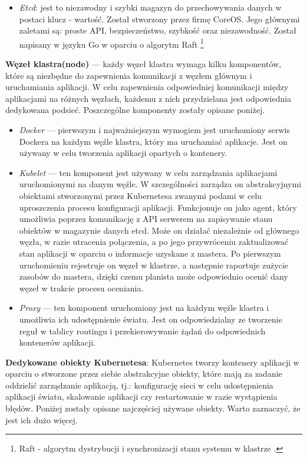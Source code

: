 \documentclass[12pt]{report}
\begin{document}
{\begin{itemize}
\item{{\it Etcd}: jest to niezawodny i szybki magazyn do przechowywania danych w postaci klucz - wartość. Został stworzony przez firmę CoreOS. Jego głównymi zaletami są: proste API, bezpieczeństwo, szybkość oraz niezawodność. Został napisany w języku Go w oparciu o algorytm Raft \footnote{Raft - algorytm dystrybucji i synchronizacji stanu systemu w klastrze \cite{raft}.}}
\end{itemize}
{\bf Węzeł klastra(node)} --- każdy węzeł klastra wymaga kilku komponentów, które są niezbędne do zapewnienia komunikacji z węzłem głównym i uruchamiania aplikacji. W celu zapewnienia odpowiedniej komunikacji między aplikacjami na różnych węzłach, każdemu z nich przydzielana jest odpowiednia dedykowana podsieć. Poszczególne komponenty zostały opisane poniżej.

\begin{itemize}
\item{{\it Docker} --- pierwszym i najważniejszym wymogiem jest uruchomiony serwis Dockera na każdym węźle klastra, który ma uruchamiać aplikacje. Jest on używany w celu tworzenia aplikacji opartych o kontenery.}

\item{{\it Kubelet} --- ten komponent jest używany w celu zarządzania aplikacjami uruchomionymi na danym węźle. W szczególności zarządza on abstrakcyjnymi obiektami stworzonymi przez Kubernetesa zwanymi podami w celu uproszczenia procesu konfiguracji aplikacji. Funkcjonuje on jako agent, który umożliwia poprzez komunikację z API serwerem na zapisywanie stanu obiektów w magazynie danych etcd. Może on działać niezależnie od głównego węzła, w razie utracenia połączenia, a po jego przywróceniu zaktualizować stan aplikacji w oparciu o informacje uzyskane z mastera. Po pierwszym uruchomieniu rejestruje on węzeł w klastrze, a następnie raportuje zużycie zasobów do mastera, dzięki czemu planista może odpowiednio ocenić dany węzeł w trakcie procesu oceniania.}

\item{{\it Proxy} --- ten komponent uruchomiony jest na każdym węźle klastra i umożliwia ich udostępnienie światu. Jest on odpowiedzialny ze tworzenie reguł w tablicy routingu i przekierowywanie żądań do odpowiednich kontenerów aplikacji.}
\end{itemize}
{\bf Dedykowane obiekty Kubernetesa}: Kubernetes tworzy kontenery aplikacji w oparciu o stworzone przez siebie abstrakcyjne obiekty, które mają za zadanie oddzielić zarządzanie aplikacją, tj.: konfigurację sieci w celu udostępnienia aplikacji światu, skalowanie aplikacji czy restartowanie w razie wystąpienia błędów. Poniżej zostały opisane najczęściej używane obiekty. Warto zaznaczyć, że jest ich dużo więcej.

}
\end{document}
